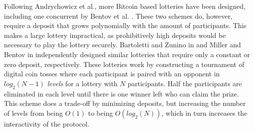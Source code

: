 Following Andrychowicz et al., more Bitcoin based lotteries have been designed, including one concurrent by Bentov et al. \cite{bentov_how_2014}. These two schemes do, however, require a deposit that grows polynomially with the amount of participants. This makes a large lottery impractical, as prohibitively high deposits would be necessary to play the lottery securely. Bartoletti and Zunino in \cite{bartoletti_constant-deposit_2017} and Miller and Bentov in \cite{miller_zero-collateral_2017} independently designed similar lotteries that require only a constant or zero deposit, respectively. These lotteries work by constructing a tournament of digital coin tosses where each participant is paired with an opponent in $log_2(N-1)$ \emph{levels} for a lottery with $N$ participants. Half the participants are eliminated in each level until there is one winner left who can claim the prize. This scheme does a trade-off by minimizing deposits, but increasing the number of levels from being $O(1)$ to being $O(log_2(N))$, which in turn increases the interactivity of the protocol. 
